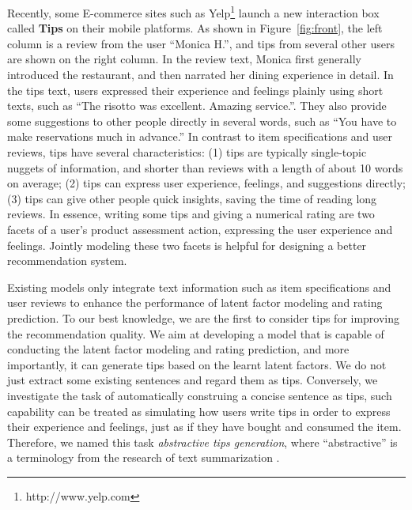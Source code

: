 \documentclass[sigconf]{acmart}
\begin{document}
Recently, some E-commerce sites such as Yelp\footnote{http://www.yelp.com} launch a new interaction box called \textbf{Tips} on their mobile platforms.
As shown in Figure~\ref{fig:front}, the left column is a review from the user ``Monica H.'', and tips from several other users are shown on the right column.
In the review text, Monica first generally introduced the restaurant, and then narrated her dining experience in detail.
In the tips text, users expressed their experience and feelings plainly using short texts, such as ``The risotto was excellent. Amazing service.''. They also provide some suggestions to other people directly in several words, such as ``You have to make reservations much in advance.''
In contrast to item specifications and user reviews, tips have several characteristics: (1) tips are typically single-topic nuggets of information, and shorter than reviews with a length of about 10 words on average; (2) tips can express user experience, feelings, and suggestions directly; (3) tips can give other people quick insights, saving the time of reading long reviews.
In essence, writing some tips and giving a numerical rating are two facets of a user's product assessment action, expressing the user experience and feelings.
Jointly modeling these two facets is helpful for designing a better recommendation system.

Existing models only integrate text information such as item specifications \cite{wang2011collaborative,wang2015collaborative,wang2016collaborative} and user reviews \cite{mcauley2013hidden,xu2014collaborative,ling2014ratings,xu2015unified,almahairi2015learning,zheng2017joint,rensocial2017} to enhance the performance of latent factor modeling and rating prediction.
To our best knowledge, we are the first to consider tips for improving the recommendation quality.
We aim at developing a model that is capable of  conducting the latent factor modeling and rating prediction, and more importantly, it can generate tips based on the learnt latent factors.
We do not just extract some existing sentences and regard them as tips.
Conversely, we investigate the task of automatically construing a concise sentence as tips, such capability can be treated as simulating how users write tips in order to express their experience and feelings, just as if
they have bought and consumed the item.
Therefore, we named this task \textit{abstractive tips generation}, where ``abstractive'' is a terminology 
from the research of text summarization \cite{lidong15absmds}.
\end{document}
